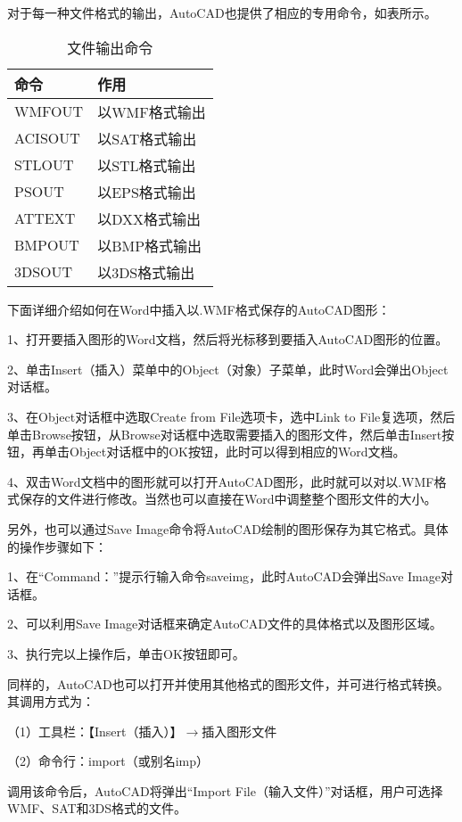 对于每一种文件格式的输出，AutoCAD也提供了相应的专用命令，如表所示。

\begin{table}[htbp]
\centering
\caption{文件输出命令}
\begin{tabular}{|l|l|}
\hline
命令		& 作用			\\
\hline
WMFOUT	& 以WMF格式输出	\\
\hline
ACISOUT	& 以SAT格式输出		\\
\hline
STLOUT		& 以STL格式输出		\\
\hline
PSOUT		& 以EPS格式输出		\\
\hline
ATTEXT		& 以DXX格式输出	\\
\hline
BMPOUT	& 以BMP格式输出	\\
\hline
3DSOUT	& 以3DS格式输出	\\
\hline
\end{tabular}
\end{table}

下面详细介绍如何在Word中插入以.WMF格式保存的AutoCAD图形：

1、打开要插入图形的Word文档，然后将光标移到要插入AutoCAD图形的位置。

2、单击Insert（插入）菜单中的Object（对象）子菜单，此时Word会弹出Object对话框。

3、在Object对话框中选取Create from File选项卡，选中Link to File复选项，然后单击Browse按钮，从Browse对话框中选取需要插入的图形文件，然后单击Insert按钮，再单击Object对话框中的OK按钮，此时可以得到相应的Word文档。

4、双击Word文档中的图形就可以打开AutoCAD图形，此时就可以对以.WMF格式保存的文件进行修改。当然也可以直接在Word中调整整个图形文件的大小。

另外，也可以通过Save Image命令将AutoCAD绘制的图形保存为其它格式。具体的操作步骤如下：

1、在“Command：”提示行输入命令saveimg，此时AutoCAD会弹出Save Image对话框。

2、可以利用Save Image对话框来确定AutoCAD文件的具体格式以及图形区域。

3、执行完以上操作后，单击OK按钮即可。

同样的，AutoCAD也可以打开并使用其他格式的图形文件，并可进行格式转换。其调用方式为：

（1）工具栏：【Insert（插入）】$\to$插入图形文件

（2）命令行：import（或别名imp）

调用该命令后，AutoCAD将弹出“Import File（输入文件）”对话框，用户可选择WMF、SAT和3DS格式的文件。

